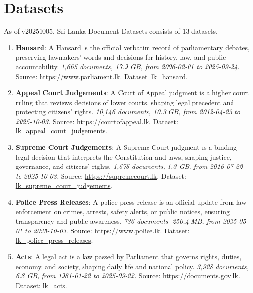 \documentclass[10pt,a4paper]{article}%
\begin{document}
\section{Datasets}%
\label{sec:Datasets}%
As of v20251005, Sri Lanka Document Datasets consists of 13 datasets.%
\begin{enumerate}%
\item%
\textbf{Hansard}: A Hansard is the official verbatim record of parliamentary debates, preserving lawmakers’ words and decisions for history, law, and public accountability.\textit{ 1,665 documents, 17.9 GB, from 2006{-}02{-}01 to 2025{-}09{-}24.} Source: \href{https://www.parliament.lk}{https://www.parliament.lk}. Dataset: \href{https://github.com/nuuuwan/lk\_hansard/tree/data/data/lk\_hansard}{lk\_hansard}.%
\item%
\textbf{Appeal Court Judgements}: A Court of Appeal judgment is a higher court ruling that reviews decisions of lower courts, shaping legal precedent and protecting citizens’ rights.\textit{ 10,146 documents, 10.3 GB, from 2012{-}04{-}23 to 2025{-}10{-}03.} Source: \href{https://courtofappeal.lk}{https://courtofappeal.lk}. Dataset: \href{https://github.com/nuuuwan/lk\_appeal\_court\_judgements/tree/data/data/lk\_appeal\_court\_judgements}{lk\_appeal\_court\_judgements}.%
\item%
\textbf{Supreme Court Judgements}: A Supreme Court judgment is a binding legal decision that interprets the Constitution and laws, shaping justice, governance, and citizens’ rights.\textit{ 1,575 documents, 1.3 GB, from 2016{-}07{-}22 to 2025{-}10{-}03.} Source: \href{https://supremecourt.lk}{https://supremecourt.lk}. Dataset: \href{https://github.com/nuuuwan/lk\_supreme\_court\_judgements/tree/data/data/lk\_supreme\_court\_judgements}{lk\_supreme\_court\_judgements}.%
\item%
\textbf{Police Press Releases}: A police press release is an official update from law enforcement on crimes, arrests, safety alerts, or public notices, ensuring transparency and public awareness.\textit{ 736 documents, 250.4 MB, from 2025{-}05{-}01 to 2025{-}10{-}03.} Source: \href{https://www.police.lk}{https://www.police.lk}. Dataset: \href{https://github.com/nuuuwan/lk\_police\_press\_releases/tree/data/data/lk\_police\_press\_releases}{lk\_police\_press\_releases}.%
\item%
\textbf{Acts}: A legal act is a law passed by Parliament that governs rights, duties, economy, and society, shaping daily life and national policy.\textit{ 3,928 documents, 6.8 GB, from 1981{-}01{-}22 to 2025{-}09{-}22.} Source: \href{https://documents.gov.lk}{https://documents.gov.lk}. Dataset: \href{https://github.com/nuuuwan/lk\_legal\_docs/tree/data\_lk\_acts/data/lk\_acts}{lk\_acts}.%

\end{enumerate}
\end{document}

